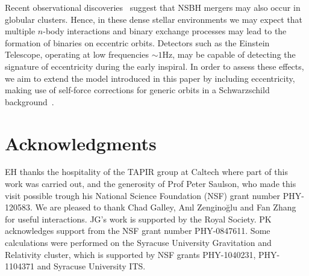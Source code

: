 \documentclass[aps,prd,showpacs,amssymb,floatfix,nofootinbib,superscriptaddress]{revtex4-1}%
\begin{document}
Recent observational discoveries~\cite{Morscher:2013} suggest that NSBH mergers may also occur in globular clusters. Hence, in these dense stellar environments we may expect that multiple \(n\)-body interactions and binary exchange processes may lead to the formation of binaries on eccentric orbits. Detectors such as the Einstein Telescope, operating at low frequencies \(\sim 1\)Hz, may be capable of detecting the signature of eccentricity during the early inspiral. In order to assess these effects, we aim to extend the model introduced in this paper by including eccentricity, making use of self-force corrections for generic orbits in a Schwarzschild background~\cite{wargar}. 




 
\section*{Acknowledgments}
EH thanks the hospitality of the TAPIR group at Caltech where part of this work was carried out, and the generosity of Prof Peter Saulson, who made this visit possible trough his National Science Foundation (NSF) grant number PHY-120583. We are pleased to thank Chad Galley, An{\i}l Zengino\u{g}lu and Fan Zhang for useful interactions. JG's work is supported by the Royal Society. PK acknowledges support from the NSF grant number PHY-0847611. Some calculations were performed on the Syracuse University Gravitation and Relativity cluster, which is supported by NSF grants PHY-1040231, PHY-1104371 and Syracuse University ITS. 


\end{document}
